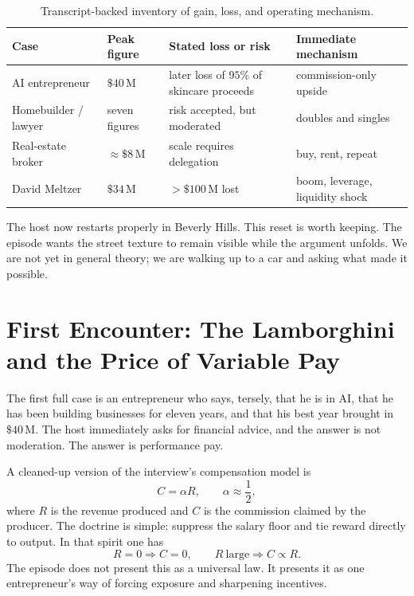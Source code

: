 \begin{table}[h]
\centering
\begin{tabular}{llll}
\hline
Case & Peak figure & Stated loss or risk & Immediate mechanism \\
\hline
AI entrepreneur & \(\$40\,\mathrm{M}\) & later loss of \(95\%\) of skincare proceeds & commission-only upside \\
Homebuilder / lawyer & seven figures & risk accepted, but moderated & doubles and singles \\
Real-estate broker & \(\approx \$8\,\mathrm{M}\) & scale requires delegation & buy, rent, repeat \\
David Meltzer & \(\$34\,\mathrm{M}\) & \(>\$100\,\mathrm{M}\) lost & boom, leverage, liquidity shock \\
\hline
\end{tabular}
\caption{Transcript-backed inventory of gain, loss, and operating mechanism.}
\end{table}

The host now restarts properly in Beverly Hills. This reset is worth keeping. The episode wants the street texture to remain visible while the argument unfolds. We are not yet in general theory; we are walking up to a car and asking what made it possible.

\section{First Encounter: The Lamborghini and the Price of Variable Pay}

The first full case is an entrepreneur who says, tersely, that he is in AI, that he has been building businesses for eleven years, and that his best year brought in \(\$40\,\mathrm{M}\). The host immediately asks for financial advice, and the answer is not moderation. The answer is performance pay.

A cleaned-up version of the interview's compensation model is
\begin{equation}
C=\alpha R,\qquad \alpha \approx \frac12,
\end{equation}
where \(R\) is the revenue produced and \(C\) is the commission claimed by the producer. The doctrine is simple: suppress the salary floor and tie reward directly to output. In that spirit one has
\begin{equation}
R=0 \Longrightarrow C=0,
\qquad
R\ \text{large} \Longrightarrow C\propto R.
\end{equation}
The episode does not present this as a universal law. It presents it as one entrepreneur's way of forcing exposure and sharpening incentives.

